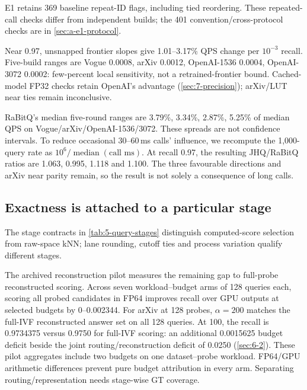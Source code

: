 E1 retains 369 baseline repeat-ID flags, including tied reordering. These repeated-call checks differ from independent builds; the 401 convention/cross-protocol checks are in \cref{sec:a-e1-protocol}.

Near 0.97, unsnapped frontier slopes give 1.01--3.17\% QPS change per $10^{-3}$ recall. Five-build ranges are Vogue 0.0008, arXiv 0.0012, OpenAI-1536 0.0004, OpenAI-3072 0.0002: few-percent local sensitivity, not a retrained-frontier bound. Cached-model FP32 checks retain OpenAI's advantage (\cref{sec:7-precision}); arXiv/LUT near ties remain inconclusive.

RaBitQ's median five-round ranges are 3.79\%, 3.34\%, 2.87\%, 5.25\% of median QPS on Vogue/arXiv/OpenAI-1536/3072. These spreads are not confidence intervals. To reduce occasional 30--60\,ms calls' influence, we recompute the 1,000-query rate as $10^6/\operatorname{median}(\text{call ms})$.
At recall 0.97, the resulting JHQ/RaBitQ ratios are 1.063, 0.995,
1.118 and 1.100. The three favourable directions and arXiv near parity
remain, so the result is not solely a consequence of long calls.

\subsection{Exactness is attached to a particular stage}
\label{sec:7-recall-attribution}

The stage contracts in \cref{tab:5-query-stages} distinguish computed-score
selection from raw-space kNN; lane rounding, cutoff ties and process
variation qualify different stages.


The archived reconstruction pilot measures the remaining gap to
full-probe reconstructed scoring.
Across seven workload--budget arms of 128 queries each, scoring all
probed candidates in FP64 improves recall over GPU outputs at selected budgets by
0--0.002344. For arXiv at 128 probes, $\alpha=200$ matches the full-IVF
reconstructed answer set on all 128 queries. At 100, the recall is
0.9734375 versus 0.9750 for full-IVF scoring: an additional 0.0015625
budget deficit beside the joint routing/reconstruction deficit of
0.0250 (\cref{sec:6-2}). These pilot aggregates include two budgets on one dataset--probe workload. FP64/GPU arithmetic differences prevent pure budget attribution in every arm. Separating routing/representation needs stage-wise GT coverage.
